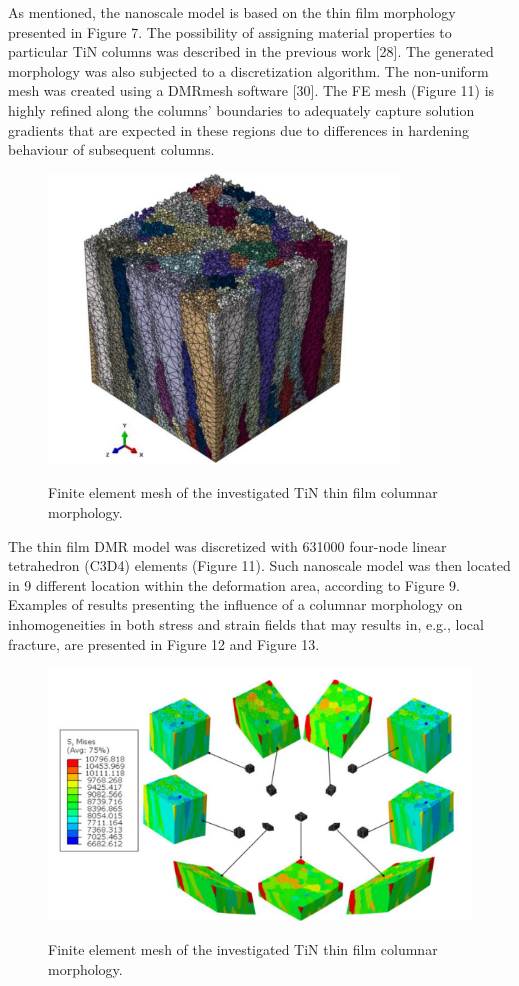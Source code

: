 \documentclass[journal,article,submit,pdftex,moreauthors]{Definitions/mdpi}
\begin{document}
As mentioned, the nanoscale model is based on the thin film morphology presented in Figure 7. The possibility of assigning material properties to particular TiN columns was described in the previous work [28]. The generated morphology was also subjected to a discretization algorithm. The non-uniform mesh was created using a DMRmesh software [30]. The FE mesh (Figure 11) is highly refined along the columns' boundaries to adequately capture solution gradients that are expected in these regions due to differences in hardening behaviour of subsequent columns. 
 
\begin{figure}[H]
  \captionsetup{justification=centering}
  \centering
  \includegraphics{Definitions/picture11.png}
  \label{fig:obraz11}
    \caption{Finite element mesh of the investigated TiN thin film columnar morphology.}
\end{figure}  
 
The thin film DMR model was discretized with 631000 four-node linear tetrahedron (C3D4) elements (Figure 11). Such nanoscale model was then located in 9 different location within the deformation area, according to Figure 9. Examples of results presenting the influence of a columnar morphology on inhomogeneities in both stress and strain fields that may results in, e.g., local fracture, are presented in Figure 12 and Figure 13.
 
\begin{figure}[H]
  \captionsetup{justification=centering}
  \centering
  \includegraphics{Definitions/picture12.png}
  \label{fig:obraz12}
    \caption{Finite element mesh of the investigated TiN thin film columnar morphology.}
\end{figure}
 
\end{document}
